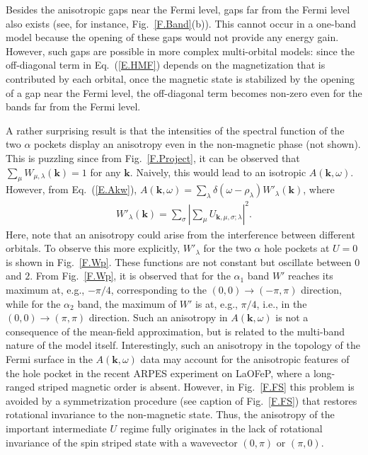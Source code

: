 \documentclass[aps,prb,superscriptaddress,preprintnumbers,
showpacs,legalpaper,twoside,twocolumn,amsmath,amssymb]{revtex4}
\begin{document}
Besides the anisotropic gaps near the
Fermi level, gaps far from the Fermi level also exists (see, for instance,
Fig.~\ref{F.Band}(b)). This cannot occur in a
one-band model because the opening of these gaps would not provide any
energy gain. However, such gaps are possible in more complex multi-orbital
models: since the off-diagonal term in Eq.~(\ref{E.HMF}) depends on the
magnetization that is contributed by each orbital, once the magnetic state
is stabilized by the opening of a gap near the Fermi level, the
off-diagonal term becomes non-zero even for the bands far from the Fermi
level.


A rather surprising result is that the intensities of the spectral
function of the two $\alpha$ pockets display an anisotropy even
in the non-magnetic phase (not shown).
This is puzzling since from Fig.~\ref{F.Project}, it can be observed that $\sum_{\mu}
W_{\mu,\lambda} (\mathbf{k})= 1$ for any $\mathbf{k}$. Naively, this
would lead to an isotropic $A(\mathbf{k},\omega)$. However, from
Eq.~(\ref{E.Akw}), $A(\mathbf{k},\omega)= \sum_{\lambda}
\delta(\omega-\rho_\lambda) W'_{\lambda}(\mathbf{k})$, where
\begin{eqnarray}\label{E.Wp}
W'_{\lambda}(\mathbf{k}) =
\sum_{\sigma}|\sum_{\mu}U_{\mathbf{k},\mu,\sigma;\lambda}|^2.
\end{eqnarray}
Here, note that an anisotropy could arise from the interference between
different orbitals. To observe this more explicitly,  $W'_\lambda$ for
the two $\alpha$ hole pockets at $U=0$ is shown
in Fig.~\ref{F.Wp}. These functions are not
constant but oscillate between $0$ and $2$. From Fig.~\ref{F.Wp}, it is
observed that for the $\alpha_1$ band $W'$ reaches its maximum at, e.g.,
$-\pi/4$, corresponding to the $(0,0)\rightarrow(-\pi,\pi)$
direction, while for the $\alpha_2$ band, the maximum of $W'$ is at, e.g.,
$\pi/4$, i.e., in the $(0,0)\rightarrow(\pi,\pi)$ direction.
Such an anisotropy in $A(\mathbf{k},\omega)$ is not a
consequence of the mean-field approximation, but is related to the
multi-band nature of the model itself.
Interestingly, such an anisotropy in the topology of the Fermi surface
in the $A(\mathbf{k},\omega)$ data may account for the anisotropic
features of the hole pocket in the recent ARPES experiment on
LaOFeP,\cite{LaOFeP_ARPES} where a long-ranged striped magnetic order is
absent.\cite{LaOFeP_SDW}
However,
in Fig.~\ref{F.FS} this problem is avoided by a symmetrization procedure (see
caption of Fig.~\ref{F.FS}) that restores rotational invariance to the non-magnetic
state. Thus, the anisotropy of the important intermediate $U$ regime fully originates
in the lack of rotational invariance of the spin striped state with a wavevector
$(0,\pi)$ or $(\pi,0)$.
\end{document}
